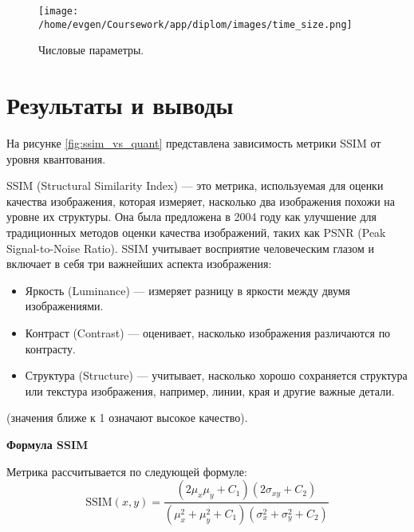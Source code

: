 \begin{figure}[h!]
    \centering
    \texttt{[image: /home/evgen/Coursework/app/diplom/images/time\_size.png]}
    \caption{Числовые параметры.}
    \label{fig:time_size}
\end{figure}



\clearpage
\section{Результаты и выводы}


На рисунке \ref{fig:ssim_vs_quant} представлена зависимость метрики SSIM от уровня квантования. 

SSIM (Structural Similarity Index) — это метрика, используемая для оценки качества изображения, 
которая измеряет, насколько два изображения похожи на уровне их структуры. 
Она была предложена в 2004 году как улучшение для традиционных методов оценки качества изображений, 
таких как PSNR (Peak Signal-to-Noise Ratio). 
SSIM учитывает восприятие человеческим глазом и включает в себя три важнейших аспекта изображения:
\begin{itemize}
    \item Яркость (Luminance) — измеряет разницу в яркости между двумя изображениями.
    \item Контраст (Contrast) — оценивает, насколько изображения различаются по контрасту.
    \item Структура (Structure) — учитывает, насколько хорошо сохраняется структура или текстура изображения, например, линии, края и другие важные детали.
\end{itemize}
(значения ближе к 1 означают высокое качество).

\textbf{Формула SSIM}

Метрика рассчитывается по следующей формуле:
\begin{equation}
\text{SSIM}(x, y) = 
\frac{(2\mu_x\mu_y + C_1)(2\sigma_{xy} + C_2)}
     {(\mu_x^2 + \mu_y^2 + C_1)(\sigma_x^2 + \sigma_y^2 + C_2)}
\end{equation}



